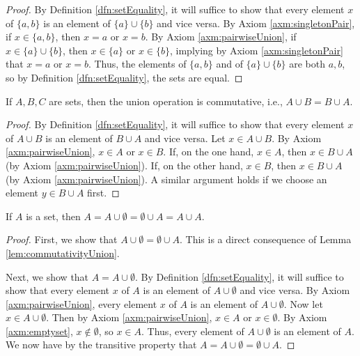 \documentclass[../main.tex]{subfiles}
\begin{document}
\begin{enumerate}[ref={\thesection.\arabic*}]
\begin{lem}
        \begin{proof}
            By Definition \ref{dfn:setEquality}, it will suffice to show that every element $x$ of $\{a,b\}$ is an element of $\{a\}\cup\{b\}$ and vice versa. By Axiom \ref{axm:singletonPair}, if $x\in\{a,b\}$, then $x=a$ or $x=b$. By Axiom \ref{axm:pairwiseUnion}, if $x\in\{a\}\cup\{b\}$, then $x\in\{a\}$ or $x\in\{b\}$, implying by Axiom \ref{axm:singletonPair} that $x=a$ or $x=b$. Thus, the elements of $\{a,b\}$ and of $\{a\}\cup\{b\}$ are both $a,b$, so by Definition \ref{dfn:setEquality}, the sets are equal.
        \end{proof}
    \end{lem}
    \begin{lem}
        If $A,B,C$ are sets, then the union operation is commutative, i.e., $A\cup B=B\cup A$.
        \begin{proof}
            By Definition \ref{dfn:setEquality}, it will suffice to show that every element $x$ of $A\cup B$ is an element of $B\cup A$ and vice versa. Let $x\in A\cup B$. By Axiom \ref{axm:pairwiseUnion}, $x\in A$ or $x\in B$. If, on the one hand, $x\in A$, then $x\in B\cup A$ (by Axiom \ref{axm:pairwiseUnion}). If, on the other hand, $x\in B$, then $x\in B\cup A$ (by Axiom \ref{axm:pairwiseUnion}). A similar argument holds if we choose an element $y\in B\cup A$ first.
        \end{proof}
    \end{lem}
    \begin{lem}
        If $A$ is a set, then $A=A\cup\emptyset=\emptyset\cup A=A\cup A$.
        \begin{proof}
            First, we show that $A\cup\emptyset=\emptyset\cup A$. This is a direct consequence of Lemma \ref{lem:commutativityUnion}.\par
            Next, we show that $A=A\cup\emptyset$. By Definition \ref{dfn:setEquality}, it will suffice to show that every element $x$ of $A$ is an element of $A\cup\emptyset$ and vice versa. By Axiom \ref{axm:pairwiseUnion}, every element $x$ of $A$ is an element of $A\cup\emptyset$. Now let $x\in A\cup\emptyset$. Then by Axiom \ref{axm:pairwiseUnion}, $x\in A$ or $x\in\emptyset$. By Axiom \ref{axm:emptyset}, $x\notin\emptyset$, so $x\in A$. Thus, every element of $A\cup\emptyset$ is an element of $A$. We now have by the transitive property that $A=A\cup\emptyset=\emptyset\cup A$.\par

\end{proof}
\end{lem}
\end{enumerate}
\end{document}
